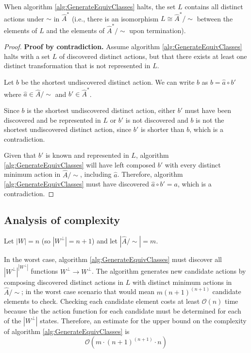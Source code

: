 \begin{proposition}
    When algorithm \ref{alg:GenerateEquivClasses} halts, the set $L$ contains all distinct actions under $\sim$ in $\hat{A}^{*}$ (i.e., there is an isomorphism $L \cong \hat{A}^{*}/\sim$ between the elements of $L$ and the elements of $\hat{A}^{*}/\sim$ upon termination).
\end{proposition}
\begin{proof}
    \textbf{Proof by contradiction.}
    Assume algorithm \ref{alg:GenerateEquivClasses} halts with a set $L$ of discovered distinct actions, but that there exists at least one distinct transformation that is not represented in $L$.

    Let $b$ be the shortest undiscovered distinct action.
    We can write $b$ as $b = \hat{a} \circ b'$ where $\hat{a} \in \hat{A}/\sim$ and $b' \in \hat{A}^{\ast}$.

    Since $b$ is the shortest undiscovered distinct action, either $b'$ must have been discovered and be represented in $L$ or $b'$ is not discovered and $b$ is not the shortest undiscovered distinct action, since $b'$ is shorter than $b$, which is a contradiction.

    Given that $b'$ is known and represented in $L$, algorithm \ref{alg:GenerateEquivClasses} will have left composed $b'$ with every distinct minimum action in $\hat{A}/\sim$, including $\hat{a}$.
    Therefore, algorithm \ref{alg:GenerateEquivClasses} must have discovered $\hat{a} \circ b' = a$, which is a contradiction.
\end{proof}


\subsection{Analysis of complexity}

Let $|W| = n$ (so $|W^{\bot}| = n+1$) and let $|\hat{A}/\sim| = m$.

In the worst case, algorithm \ref{alg:GenerateEquivClasses} must discover all $|W^{\bot}|^{|W^{\bot}|}$ functions $W^{\bot} \to W^{\bot}$.
The algorithm generates new candidate actions by composing discovered distinct actions in $L$ with distinct minimum actions in $\hat{A}/\sim$; in the worst case scenario that would mean $m (n+1)^{(n+1)}$ candidate elements to check.
Checking each candidate element costs at least $\mathcal{O}(n)$ time because the the action function for each candidate must be determined for each of the $|W^{\bot}|$ states.
Therefore, an estimate for the upper bound on the complexity of algorithm \ref{alg:GenerateEquivClasses} is
\begin{equation}
    \mathcal{O}(m \cdot (n+1)^{(n+1)} \cdot n)
\end{equation}





